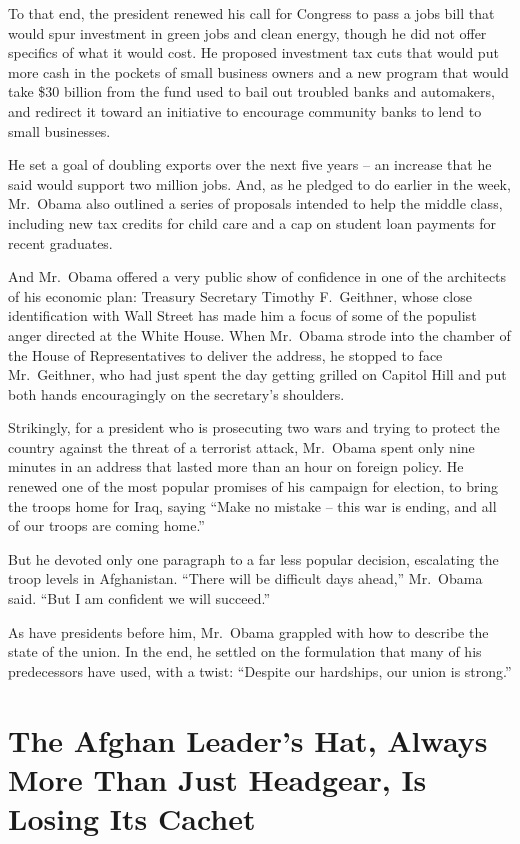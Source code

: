 ﻿\documentclass[12pt]{article}
\begin{document}
To that end, the president renewed his call for Congress to pass a jobs bill that would spur
investment in green jobs and clean energy, though he did not offer specifics of what it would cost.
He proposed investment tax cuts that would put more cash in the pockets of small business owners and
a new program that would take \$30 billion from the fund used to bail out troubled banks and
automakers, and redirect it toward an initiative to encourage community banks to lend to small
businesses.

He set a goal of doubling exports over the next five years -- an increase that he said would support
two million jobs. And, as he pledged to do earlier in the week, Mr.~Obama also outlined a series of
proposals intended to help the middle class, including new tax credits for child care and a cap on
student loan payments for recent graduates.

And Mr.~Obama offered a very public show of confidence in one of the architects of his economic
plan: Treasury Secretary Timothy F.~Geithner, whose close identification with Wall Street has made
him a focus of some of the populist anger directed at the White House. When Mr.~Obama strode into
the chamber of the House of Representatives to deliver the address, he stopped to face Mr.~Geithner,
who had just spent the day getting grilled on Capitol Hill and put both hands encouragingly on the
secretary's shoulders.

Strikingly, for a president who is prosecuting two wars and trying to protect the country against
the threat of a terrorist attack, Mr.~Obama spent only nine minutes in an address that lasted more
than an hour on foreign policy. He renewed one of the most popular promises of his campaign for
election, to bring the troops home for Iraq, saying ``Make no mistake -- this war is ending, and all
of our troops are coming home.''

But he devoted only one paragraph to a far less popular decision, escalating the troop levels in
Afghanistan. ``There will be difficult days ahead,'' Mr.~Obama said. ``But I am confident we will
succeed.''

As have presidents before him, Mr.~Obama grappled with how to describe the state of the union. In
the end, he settled on the formulation that many of his predecessors have used, with a twist:
``Despite our hardships, our union is strong.''

\section{The Afghan Leader's Hat, Always More Than Just Headgear, Is Losing Its Cachet}
\end{document}
